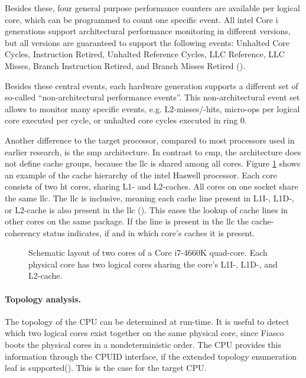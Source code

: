 Besides these, four general purpose performance counters are available per
logical core, which can be programmed to count one specific event.
All \gls{intel} Core i generations support architectural performance monitoring
in different versions, but all versions are guaranteed to support the following
events:
Unhalted Core Cycles, Instruction Retired, Unhalted Reference Cycles,
LLC Reference, LLC Misses, Branch Instruction Retired,
and Branch Misses Retired (\cite{intel_arch_ref_manual_2015}).

Besides these central events, each hardware generation supports a different set
of so-called ``non-architectural performance events''.
This non-architectural event set allows to monitor many specific events, e.g.
L2-misses/-hits, micro-ops per logical core executed per cycle, or unhalted
core cycles executed in ring 0.

Another difference to the target processor, compared to most processors used in
earlier research, is the \gls{smp} architecture.
In contrast to \gls{cmp}, the architecture does not define cache groups,
because the \gls{llc} is shared among all cores.
Figure \ref{state:fig:core_layout} shows an example of the cache hierarchy of
the \gls{intel} Haswell processor.
Each core consists of two \gls{ht} cores, sharing L1- and L2-caches.
All cores on one socket share the same \gls{llc}.
The \gls{llc} is inclusive, meaning each cache line present in L1I-, L1D-, or
L2-cache is also present in the \gls{llc}
(\cite[2-23]{intel_optimization_manual_2015}).
This eases the lookup of cache lines in other cores on the same package.
If the line is present in the \gls{llc} the cache-coherency status indicates,
if and in which core's caches it is present.


\begin{figure}[h!]
  \setcapindent*{1em}
  \setlength{\columnsep}{10mm}
  \begin{captionbeside}{Schematic layout of two cores of a Core i7-4660K quad-core.
    Each physical core has two logical cores sharing the core's L1I-,
    L1D-, and L2-cache.}
  
\end{captionbeside}
  \label{state:fig:core_layout}
\end{figure}

\paragraph{Topology analysis.}
The topology of the CPU can be determined at run-time.
It is useful to detect which two logical cores exist together on the same
physical core, since Fiasco boots the physical cores in a nondeterministic order.
The CPU provides this information through the CPUID interface, if the
extended topology enumeration leaf is supported(\cite[Vol.2A
3-179]{intel_arch_ref_manual_2015}). This is the case for the
target CPU.

